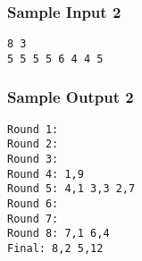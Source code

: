 \subsubsection{Sample Input 2}\label{sample-input-2}
\begin{verbatim}
8 3
5 5 5 5 6 4 4 5
\end{verbatim}

\subsubsection{Sample Output 2}\label{sample-output-2}
\begin{verbatim}
Round 1:
Round 2:
Round 3:
Round 4: 1,9
Round 5: 4,1 3,3 2,7
Round 6:
Round 7:
Round 8: 7,1 6,4
Final: 8,2 5,12
\end{verbatim}